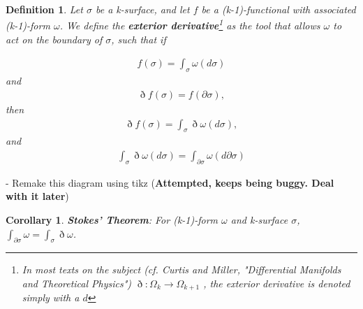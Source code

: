 \documentclass{book}
\newtheorem{defn}[equation]{Definition}
\newtheorem{coro}[equation]{Corollary}
\begin{document}
\begin{defn}
	Let $\sigma$ be a k-surface, and let $f$ be a (k-1)-functional with associated (k-1)-form $\omega$. We define the \textbf{exterior derivative}\footnote{In most texts on the subject (cf. Curtis and Miller, "Differential Manifolds and Theoretical Physics") $\eth : \Omega_k \to \Omega_{k+1}$ , the exterior derivative is denoted simply with a $d$} as the tool that allows $\omega$ to act on the boundary of $\sigma$, such that if
	
	\begin{gather}f(\sigma) = \int_{\sigma}\omega(d\sigma)\end{gather} and \begin{gather} \eth f(\sigma) = f(\partial\sigma), \end{gather}
	then
	\begin{gather} \eth f(\sigma) = \int_{\sigma} \eth\omega(d\sigma),\end{gather} 
	and
	\begin{gather} \int_\sigma \eth\omega(d\sigma) = \int_{\partial\sigma} \omega(d\partial\sigma)\end{gather}
\end{defn}




 
 
 
 
 
 


- Remake this diagram using tikz (\textbf{Attempted, keeps being buggy. Deal with it later})



\begin{coro}
	\textbf{Stokes' Theorem}: For (k-1)-form $\omega$ and k-surface $\sigma$, $\int_{\partial \sigma}\omega = \int_{\sigma}\eth\omega$. 
\end{coro}
\end{document}
